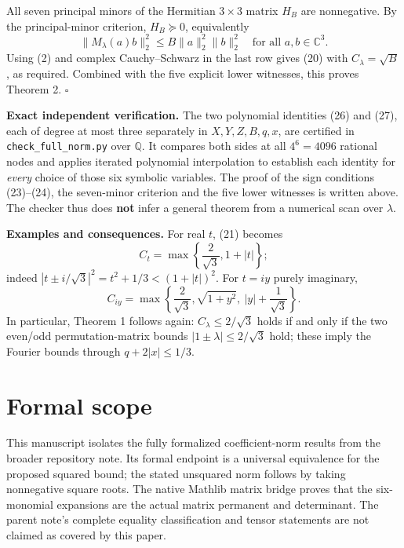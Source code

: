\documentclass[11pt]{article}
\begin{document}
All seven principal minors of the Hermitian \(3\times3\) matrix \(H_B\)
are nonnegative. By the principal-minor criterion, \(H_B\succeq0\),
equivalently \[
\|M_\lambda(a)b\|_2^2\le
B\|a\|_2^2\|b\|_2^2
\quad\text{for all }a,b\in\mathbb C^3.
\] Using (2) and complex Cauchy--Schwarz in the last row gives (20) with
\(C_\lambda=\sqrt B\), as required. Combined with the five explicit
lower witnesses, this proves Theorem 2. \(\square\)

\textbf{Exact independent verification.} The two polynomial identities
(26) and (27), each of degree at most three separately in
\(X,Y,Z,B,q,x\), are certified in \texttt{check\_full\_norm.py} over
\(\mathbb Q\). It compares both sides at all \(4^6=4096\) rational nodes
and applies iterated polynomial interpolation to establish each identity
for \emph{every} choice of those six symbolic variables. The proof of
the sign conditions (23)--(24), the seven-minor criterion and the five
lower witnesses is written above. The checker thus does \textbf{not}
infer a general theorem from a numerical scan over \(\lambda\).

\textbf{Examples and consequences.} For real \(t\), (21) becomes \[
C_t=\max\left\{\frac2{\sqrt3},1+|t|\right\};
\tag{28}
\] indeed \(|t\pm i/\sqrt3|^2=t^2+1/3<
(1+|t|)^2\). For \(t=iy\) purely imaginary, \[
C_{iy}=\max\left\{\frac2{\sqrt3},
\sqrt{1+y^2},\ |y|+\frac1{\sqrt3}\right\}.
\tag{29}
\] In particular, Theorem 1 follows again: \(C_\lambda\le2/\sqrt3\)
holds if and only if the two even/odd permutation-matrix bounds
\(|1\pm\lambda|\le2/\sqrt3\) hold; these imply the Fourier bounds
through \(q+2|x|\le1/3\).

\section{Formal scope}\label{formal-scope}

This manuscript isolates the fully formalized coefficient-norm results
from the broader repository note. Its formal endpoint is a universal
equivalence for the proposed squared bound; the stated unsquared norm
follows by taking nonnegative square roots. The native Mathlib matrix
bridge proves that the six-monomial expansions are the actual matrix
permanent and determinant. The parent note's complete equality
classification and tensor statements are not claimed as covered by this
paper.
\end{document}
